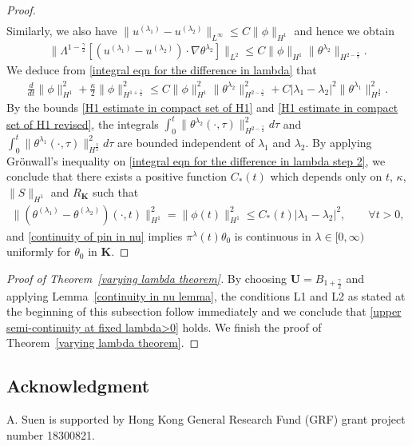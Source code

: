 \documentclass[reqno]{amsart}%
\theoremstyle{definition}
\theoremstyle{remark}
\numberwithin{equation}{section}
\newcommand{\dis}{\displaystyle}
\newcommand{\1}{\mathbf{1}}
\newcommand{\pin}{\pi^{\lambda}}
\newcommand{\U}{\mathbf{U}}
\newcommand{\Uc}{\mathbf{K}}
\numberwithin{equation}{section}
\numberwithin{theorem}{section}
\numberwithin{figure}{section}
\begin{document}
\begin{proof}
\begin{align*}
\end{align*}
Similarly, we also have $\|u^{(\lambda_1)}-u^{(\lambda_2)}\|_{L^\infty}\le C\|\phi\|_{H^1}$ and hence we obtain
\begin{align*}
\|\Lambda^{1-\frac{\gamma}{2}}[(u^{(\lambda_1)}-u^{(\lambda_2)})\cdot\nabla\theta^{\lambda_2}]\|_{L^2}\le C\|\phi\|_{H^1}\|\theta^{\lambda_2}\|_{H^{2-\frac{\gamma}{2}}}.
\end{align*}
We deduce from \eqref{integral eqn for the difference in lambda} that
\begin{align}\label{integral eqn for the difference in lambda step 2}
\frac{d}{dt}\|\phi\|^2_{H^1}+\frac{\kappa}{2}\|\phi\|^2_{H^{1+\frac{\gamma}{2}}}\le C\|\phi\|_{H^1}^2\|\theta^{\lambda_2}\|_{H^{2-\frac{\gamma}{2}}}^2+C|\lambda_1-\lambda_2|^2\|\theta^{\lambda_1}\|^2_{H^\frac{3}{2}}.
\end{align}
By the bounds \eqref{H1 estimate in compact set of H1} and \eqref{H1 estimate in compact set of H1 revised}, the integrals $\dis\int_0^t \|\theta^{\lambda_2}(\cdot,\tau)\|_{H^{2-\frac{\gamma}{2}}}^2d\tau$ and \newline $\dis\int_0^t \|\theta^{\lambda_1}(\cdot,\tau)\|_{H^{\frac{3}{2}}}^2d\tau$ are bounded independent of $\lambda_1$ and $\lambda_2$. By applying Gr\"{o}nwall's inequality on \eqref{integral eqn for the difference in lambda step 2}, we conclude that there exists a positive function $C_*(t)$ which depends only on $t$, $\kappa$, $\|S\|_{H^1}$ and $R_{\Uc}$ such that
\begin{align}\label{continuity of pin in nu}
\|(\theta^{(\lambda_1)}-\theta^{(\lambda_2)})(\cdot,t)\|^2_{H^1}=\|\phi(t)\|^2_{H^1}\le C_*(t)|\lambda_1-\lambda_2|^2,\qquad\forall t>0,
\end{align}
and \eqref{continuity of pin in nu} implies $\pin(t)\theta_0$ is continuous in $\lambda\in[0,\infty)$ uniformly for $\theta_0$ in $\Uc$.
\end{proof}

\begin{proof}[Proof of Theorem~\ref{varying lambda theorem}]
By choosing $\U=B_{1+\frac{\gamma}{2}}$ and applying Lemma~\ref{continuity in nu lemma}, the conditions L1 and L2 as stated at the beginning of this subsection follow immediately and we conclude that \eqref{upper semi-continuity at fixed lambda>0} holds. We finish the proof of Theorem~\ref{varying lambda theorem}.
\end{proof}


\subsection*{Acknowledgment} %
A. Suen is supported by Hong Kong General Research Fund (GRF) grant project number 18300821.





\end{document}
